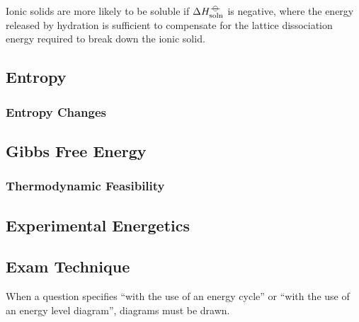 \documentclass[../main]{subfiles}
\begin{document}
	Ionic solids are more likely to be soluble if \(\Delta H_\text{soln}^{-\kern-4pt{\ominus}\kern-4pt-}\) is negative, where the energy released by hydration is sufficient to compensate for the lattice dissociation energy required to break down the ionic solid.

	\subsection{Entropy}

	\subsubsection{Entropy Changes}

	\subsection{Gibbs Free Energy}

	\subsubsection{Thermodynamic Feasibility}

	\subsection{Experimental Energetics}

	\subsection{Exam Technique}

	When a question specifies ``with the use of an energy cycle'' or ``with the use of an energy level diagram'', diagrams must be drawn.
\end{document}
